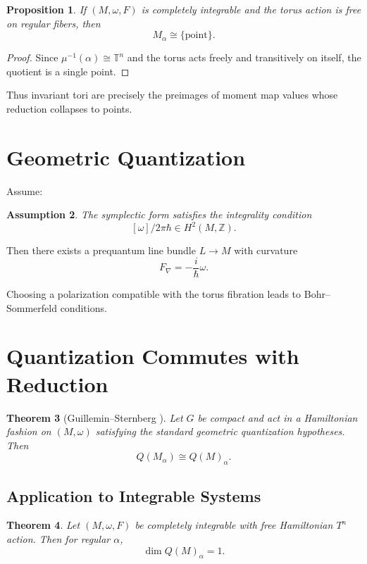 \documentclass[11pt]{article}
\newtheorem{theorem}{Theorem}[section]
\newtheorem{proposition}[theorem]{Proposition}
\newtheorem{assumption}[theorem]{Assumption}
\begin{document}
\begin{proposition}
If $(M,\omega,F)$ is completely integrable and the torus action is free on regular fibers, then
\[
M_\alpha \cong \{\text{point}\}.
\]
\end{proposition}

\begin{proof}
Since $\mu^{-1}(\alpha) \cong \mathbb{T}^n$ and the torus acts freely and transitively on itself, the quotient is a single point.
\end{proof}

Thus invariant tori are precisely the preimages of moment map values whose reduction collapses to points.

\section{Geometric Quantization}

Assume:

\begin{assumption}
The symplectic form satisfies the integrality condition
\[
[\omega]/2\pi\hbar \in H^2(M,\mathbb{Z}).
\]
\end{assumption}

Then there exists a prequantum line bundle $L \to M$ with curvature
\[
F_\nabla = -\frac{i}{\hbar}\omega.
\]

Choosing a polarization compatible with the torus fibration leads to Bohr--Sommerfeld conditions.

\section{Quantization Commutes with Reduction}

\begin{theorem}[Guillemin--Sternberg \cite{GuilleminSternberg}]
Let $G$ be compact and act in a Hamiltonian fashion on $(M,\omega)$ satisfying the standard geometric quantization hypotheses. Then
\[
Q(M_\alpha) \cong Q(M)_\alpha.
\]
\end{theorem}

\subsection{Application to Integrable Systems}

\begin{theorem}
Let $(M,\omega,F)$ be completely integrable with free Hamiltonian $T^n$ action. Then for regular $\alpha$,
\[
\dim Q(M)_\alpha = 1.
\]
\end{theorem}
\end{document}
